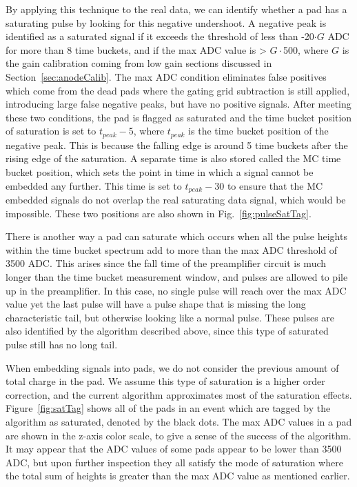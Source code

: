 By applying this technique to the real data, we can identify whether a pad has a saturating pulse by looking for this negative undershoot. A negative peak is identified as a saturated signal if it exceeds the threshold of less than -20$\cdot G$ ADC for more than 8 time buckets, and if the max ADC value is > $G\cdot$500, where $G$ is the gain calibration coming from low gain sections discussed in Section~\ref{sec:anodeCalib}. The max ADC condition eliminates false positives which come from  the dead pads where the gating grid subtraction is still applied, introducing large false negative peaks, but have no positive signals. After meeting these two conditions, the pad is flagged as saturated and the time bucket position of saturation is set to $t_{peak} - 5$, where $t_{peak}$ is the time bucket position of the negative peak. This is because the falling edge is around 5 time buckets after the rising edge of the saturation. A separate time is also stored called the MC time bucket position, which sets the point in time in which a signal cannot be embedded any further. This time is set to $t_{peak} - 30$ to ensure that the MC embedded signals do not overlap the real saturating data signal, which would be impossible. These two positions are also shown in Fig.~\ref{fig:pulseSatTag}.

There is another way a pad can saturate which occurs when all the pulse heights within the time bucket spectrum add to more than the max ADC threshold of 3500 ADC. This arises since the fall time of the preamplifier circuit is much longer than the time bucket measurement window, and pulses are allowed to pile up in the preamplifier. In this case, no single pulse will reach over the max ADC value yet the last pulse will have a pulse shape that is missing the long characteristic tail, but otherwise looking like a normal pulse. These pulses are also identified by the algorithm described above, since this type of saturated pulse  still has no long tail. 

 When embedding signals into pads, we do not consider the previous amount of total charge in the pad. We assume this type of saturation is a higher order correction, and the current algorithm approximates most of the saturation effects.  Figure~\ref{fig:satTag} shows all of the pads in an event which are tagged by the algorithm as saturated, denoted by the black dots. The max ADC values in a pad are shown in the z-axis color scale, to give a sense of the success of the algorithm. It may appear that the ADC values of some pads appear to be lower than 3500 ADC, but upon further inspection they all satisfy the mode of saturation where the total sum of heights is greater than the max ADC value as mentioned earlier. 

